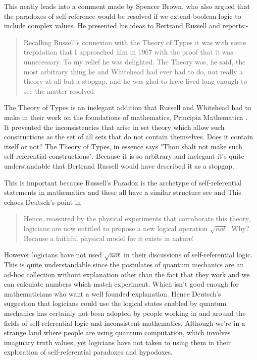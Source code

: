 This neatly leads into a comment made by Spencer Brown, who also argued that the paradoxes of self-reference would be resolved if we extend boolean logic to include complex values. He presented his ideas to Bertrand Russell and reports;-
\begin{quotation}
    Recalling Russell's connexion with the Theory of Types it was with some trepidation that I approached him in 1967 with the proof that it was unnecessary. To my relief he was delighted. The Theory was, he said, the most arbitrary thing he and Whitehead had ever had to do, not really a theory at all but a stopgap, and he was glad to have lived long enough to see the matter resolved. 
    \hfill \autocite[ix]{Spence-Brown-1969}
\end{quotation}
The Theory of Types is an inelegant addition that Russell and Whitehead had to make in their work on the foundations of mathematics, Principia Mathematica \autocite{russell_2010}. It prevented the inconsistencies that arise in  set theory which allow such constructions as the set of all sets that do not contain themselves. Does it contain itself or not? The Theory of Types, in essence says "Thou shalt not make such self-referential constructions". Because it is so arbitrary and inelegant it's quite understandable that Bertrand Russell would have described it as a stopgap. 

This is important because Russell's Paradox is the archetype of self-referential statements in mathematics and these all have a similar structure see \autocite{Lawvere_1969} and \autocite{Yanofsky2003} This echoes Deutsch's point in \autocite{deutsch_1999} 
\begin{quotation}
    Hence, reassured by the physical experiments that corroborate this theory, logicians are now entitled to propose a new logical operation $\sqrt{not}$. Why? Because a faithful physical model for it exists in nature!
\end{quotation}
However logicians have not used $\sqrt{not}$ in their discussions of self-referential logic. This is quite understandable since the postulates of quantum mechanics are an ad-hoc collection without explanation other than the fact that they work and we can calculate numbers which match experiment. Which isn't good enough for mathematicians who want a well founded explanation. Hence Deutsch's suggestion that logicians could use the logical states enabled by quantum mechanics has certainly not been adopted by people working in and around the fields of self-referential logic and inconsistent mathematics. Although we're in a strange land where people are using quantum computation, which involves imaginary truth values, yet logicians have not taken to using them in their exploration of self-referential paradoxes and hypodoxes. 

